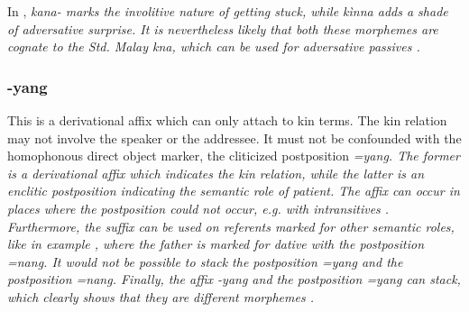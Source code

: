  

In , \em kana- \em marks the involitive nature of getting stuck, while \em kìnna \em adds a shade of adversative surprise. It is nevertheless likely that both these morphemes are cognate to the Std. Malay \em k\E na, \em which can be used for adversative passives \citep{Chung2005kena}.




% 
% 
% 



\subsubsection{-yang}\label{sec:morph:-yang}
This is a derivational affix which can only attach to kin terms. The kin relation may not involve the speaker or the addressee. It must not be confounded with the homophonous direct object marker, the cliticized postposition \em =yang\em {}. The former is a derivational affix which indicates the kin relation, while the latter is an enclitic postposition indicating the semantic role of patient. The affix can occur in places where the postposition could not occur, e.g. with intransitives . Furthermore, the suffix can be used on referents marked for other semantic roles, like in  example , where the father is marked for dative with the postposition \em =nang\em. It would not be possible to stack the postposition \em =yang \em and the postposition \em =nang\em. Finally, the affix \em -yang \em and the postposition \em =yang \em can stack, which clearly shows that they are different morphemes .

